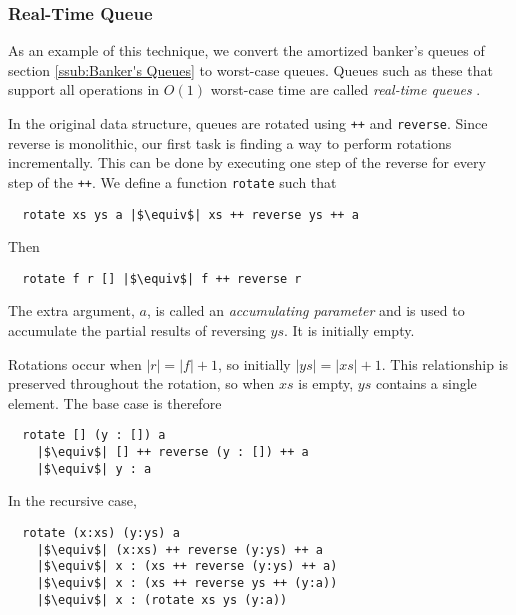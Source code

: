 \documentclass[12pt, a4paper]{article} %
\newcommand{\code}[1]{\texttt{#1}} %
\newcommand{\haskell}[1]{\texttt{#1}}
\begin{document}
\subsubsection{Real-Time Queue}%
\label{ssub:Real-Time Queue}

As an example of this technique, we convert the amortized banker's queues of section \ref{ssub:Banker's Queues} to worst-case queues. Queues such as these that support all operations in $O(1)$ worst-case time are called \textit{real-time queues} \cite{hm81}.

In the original data structure, queues are rotated using \haskell{++} and \code{reverse}. Since reverse is monolithic, our first task is finding a way to perform rotations incrementally. This can be done by executing one step of the reverse for every step of the \haskell{++}. We define a function \code{rotate} such that

\begin{verbatim}
  rotate xs ys a |$\equiv$| xs ++ reverse ys ++ a
\end{verbatim}

Then

\begin{verbatim}
  rotate f r [] |$\equiv$| f ++ reverse r
\end{verbatim}

The extra argument, $a$, is called an \textit{accumulating parameter} and is used to accumulate the partial results of reversing $ys$. It is initially empty.

\newpage

Rotations occur when $|r| = |f| + 1$, so initially $|ys| = |xs| + 1$. This relationship is preserved throughout the rotation, so when $xs$ is empty, $ys$ contains a single element. The base case is therefore

\begin{verbatim}
  rotate [] (y : []) a
    |$\equiv$| [] ++ reverse (y : []) ++ a
    |$\equiv$| y : a
\end{verbatim}

In the recursive case,

\begin{verbatim}
  rotate (x:xs) (y:ys) a
    |$\equiv$| (x:xs) ++ reverse (y:ys) ++ a
    |$\equiv$| x : (xs ++ reverse (y:ys) ++ a)
    |$\equiv$| x : (xs ++ reverse ys ++ (y:a))
    |$\equiv$| x : (rotate xs ys (y:a))
\end{verbatim}
\end{document}
